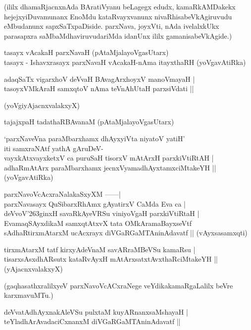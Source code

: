\noindent
(ililx dhamaRjacnxnAda BAratiVyanu beLagegx edudx, kamaRkAMDakekx hejejxyiDuva\break munanx EnoMdu kataRvayxvanunx nivaRhisabeVkAgiruvudu eMbudanunx sapxSaTxpaDi\-side. parxNava, joyxVti, nAda ivelalxkUkx para\-sapxra saMbaMdhaviruvudariMda idanUnx ililx gamanisabeVkAgide.)
\begin{itemize}
{\bf 
\item[23.] tasayx vAcakaH parxNavaH (pAtaMjalayoVgasUtarx)\\\label{147}
tasayx - Ishavxrasayx parxNavaH vAcakaH-nAma itayxthaRH 
\hfill{(yoVgavAtiRka)}
\item[24.] adaqSaTx vigarxhoV deVvaH BAvagArxhoyxV manoVmayaH |\\\label{147}
tasoyxVMkAraH samxqtoV nAma teVnAhUtaH parxsiVdati ||

\hfill{(yoVgiyAjacnxvalakxyX)}
\item[25.] tajajxpaH tadathaRBAvanaM \hfill{(pAtaMjalayoVgasUtarx)}\label{147}
\item[26.] `parxNaveVna paraMbarxhamx dhAyxyiVta niyatoV yatiH'\\\label{147}
iti samxraNAtf yathA gAruDeV-\\
vayxkAtxvayxketxV ca puruSaH tisorxV mAtArxH parxkiVtiRtAH |\\
adhaRmAtArx paraMbarxhamx jecnxVyamadhAyxtamxciMtakeYH ||
\hfill{(yoVgavAtiRka)}
\item[27.] parxNavoVcAcxraNalakaSxyXM ------|\\\label{147}
parxNavasayx QuSibarxRhAmx gAyatirxV CaMda Eva ca |\\
deVvoV\char'263ginxH savaRkAyeVRSu viniyoVgaH parxkiVtiRtaH |\\
EvamaqSAyxdikaM samxqtAtxvX tata OMkAramaBayxseVtf\\
sAdhaRtirxmAtarxM ucAcxrayx diVGaRGaMTAninAdavatf ||
\hfill{(vAyxsasamxqti)}

\item[28.] tirxmAtarxM tatf kirxyAdeVnaM savARraMBeVSu kamaRsu |\\\label{147}
tisarxsAsxdhARsutx kataRvAyxH mAtArxsatxtAvxthaRciMtakeYH ||
\hfill{(yAjacnxvalakxyX)}}
\end{itemize}

\noindent
(gaqhasathxralilxyeV parxNavoVcACxraNege veYdikakamaRgaLalilx beVre karxmavuMTu.)

\begin{itemize}
{\bf 
\item[29.] deVvatAdhAyxnakAleVSu pulxtaM kuyARnanxsaMshayaH |\\\label{148}
teYladhArAvadaciCxnanxM diVGaRGaMTAninAdavatf ||}
\end{itemize}

